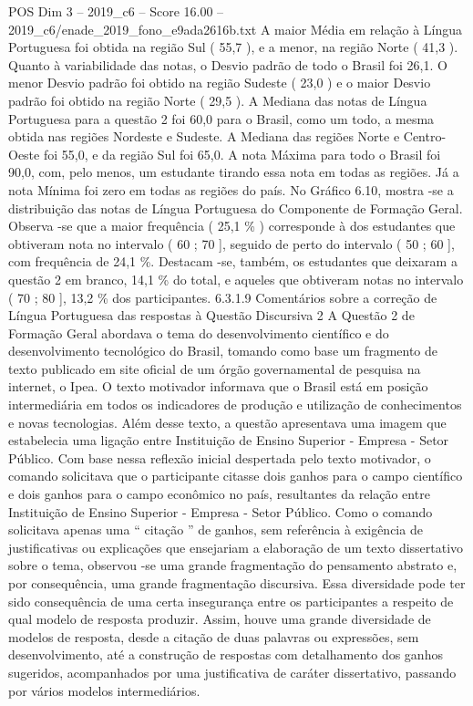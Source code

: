 \begin{textsample}{POS Dim 3 – 2019\_c6 – Score 16.00 – 2019\_c6/enade\_2019\_fono\_e9ada2616b.txt}
A maior Média em relação à Língua Portuguesa foi obtida na região Sul ( 55,7 ), e a menor, na região Norte ( 41,3 ).
Quanto à variabilidade das notas, o Desvio padrão de todo o Brasil foi 26,1.
O menor Desvio padrão foi obtido na região Sudeste ( 23,0 ) e o maior Desvio padrão foi obtido na região Norte ( 29,5 ).
A Mediana das notas de Língua Portuguesa para a questão 2 foi 60,0 para o Brasil, como um todo, a mesma obtida nas regiões Nordeste e Sudeste.
A Mediana das regiões Norte e Centro-Oeste foi 55,0, e da região Sul foi 65,0.
A nota Máxima para todo o Brasil foi 90,0, com, pelo menos, um estudante tirando essa nota em todas as regiões.
Já a nota Mínima foi zero em todas as regiões do país.
No Gráfico 6.10, mostra -se a distribuição das notas de Língua Portuguesa do Componente de Formação Geral.
Observa -se que a maior frequência ( 25,1 \% ) corresponde à dos estudantes que obtiveram nota no intervalo ( 60 ; 70 ], seguido de perto do intervalo ( 50 ; 60 ], com frequência de 24,1 \%.
Destacam -se, também, os estudantes que deixaram a questão 2 em branco, 14,1 \% do total, e aqueles que obtiveram notas no intervalo ( 70 ; 80 ], 13,2 \% dos participantes. 6.3.1.9 Comentários sobre a correção de Língua Portuguesa das respostas à Questão Discursiva 2 A Questão 2 de Formação Geral abordava o tema do desenvolvimento científico e do desenvolvimento tecnológico do Brasil, tomando como base um fragmento de texto publicado em site oficial de um órgão governamental de pesquisa na internet, o Ipea.
O texto motivador informava que o Brasil está em posição intermediária em todos os indicadores de produção e utilização de conhecimentos e novas tecnologias.
Além desse texto, a questão apresentava uma imagem que estabelecia uma ligação entre Instituição de Ensino Superior - Empresa - Setor Público.
Com base nessa reflexão inicial despertada pelo texto motivador, o comando solicitava que o participante citasse dois ganhos para o campo científico e dois ganhos para o campo econômico no país, resultantes da relação entre Instituição de Ensino Superior - Empresa - Setor Público.
Como o comando solicitava apenas uma “ citação ” de ganhos, sem referência à exigência de justificativas ou explicações que ensejariam a elaboração de um texto dissertativo sobre o tema, observou -se uma grande fragmentação do pensamento abstrato e, por consequência, uma grande fragmentação discursiva.
Essa diversidade pode ter sido consequência de uma certa insegurança entre os participantes a respeito de qual modelo de resposta produzir.
Assim, houve uma grande diversidade de modelos de resposta, desde a citação de duas palavras ou expressões, sem desenvolvimento, até a construção de respostas com detalhamento dos ganhos sugeridos, acompanhados por uma justificativa de caráter dissertativo, passando por vários modelos intermediários.

\end{textsample}
